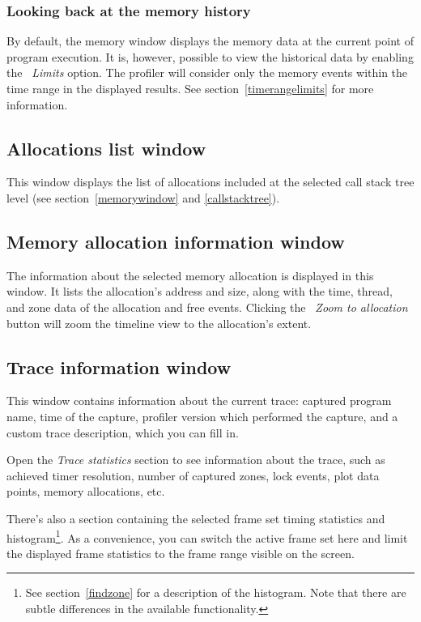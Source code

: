 \documentclass[hidelinks,titlepage,a4paper,twoside]{article}
\begin{document}
\subsubsection{Looking back at the memory history}

By default, the memory window displays the memory data at the current point of program execution. It is, however, possible to view the historical data by enabling the \emph{\faRuler{}~Limits} option. The profiler will consider only the memory events within the time range in the displayed results. See section~\ref{timerangelimits} for more information.

\subsection{Allocations list window}
\label{alloclist}

This window displays the list of allocations included at the selected call stack tree level (see section~\ref{memorywindow} and \ref{callstacktree}).

\subsection{Memory allocation information window}
\label{memallocinfo}

The information about the selected memory allocation is displayed in this window. It lists the allocation's address and size, along with the time, thread, and zone data of the allocation and free events. Clicking the \emph{\faMicroscope{}~Zoom to allocation} button will zoom the timeline view to the allocation's extent.

\subsection{Trace information window}
\label{traceinfo}

This window contains information about the current trace: captured program name, time of the capture, profiler version which performed the capture, and a custom trace description, which you can fill in.

Open the \emph{Trace statistics} section to see information about the trace, such as achieved timer resolution, number of captured zones, lock events, plot data points, memory allocations, etc.

There's also a section containing the selected frame set timing statistics and histogram\footnote{See section~\ref{findzone} for a description of the histogram. Note that there are subtle differences in the available functionality.}. As a convenience, you can switch the active frame set here and limit the displayed frame statistics to the frame range visible on the screen.
\end{document}
